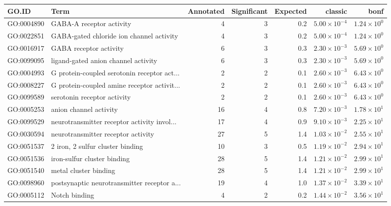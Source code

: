 \begin{table}[ht]
\centering
\begin{adjustbox}{max width=\textwidth}
\begin{tabular}{llrrrrr}
  \hline
GO.ID & Term & Annotated & Significant & Expected & classic & bonf \\ 
  \hline
GO:0004890 & GABA-A receptor activity & 4 & 3 & 0.2 & $5.00 \times 10^{-4}$ & $1.24 \times 10^{0}$ \\ 
  GO:0022851 & GABA-gated chloride ion channel activity & 4 & 3 & 0.2 & $5.00 \times 10^{-4}$ & $1.24 \times 10^{0}$ \\ 
  GO:0016917 & GABA receptor activity & 6 & 3 & 0.3 & $2.30 \times 10^{-3}$ & $5.69 \times 10^{0}$ \\ 
  GO:0099095 & ligand-gated anion channel activity & 6 & 3 & 0.3 & $2.30 \times 10^{-3}$ & $5.69 \times 10^{0}$ \\ 
  GO:0004993 & G protein-coupled serotonin receptor act... & 2 & 2 & 0.1 & $2.60 \times 10^{-3}$ & $6.43 \times 10^{0}$ \\ 
  GO:0008227 & G protein-coupled amine receptor activit... & 2 & 2 & 0.1 & $2.60 \times 10^{-3}$ & $6.43 \times 10^{0}$ \\ 
  GO:0099589 & serotonin receptor activity & 2 & 2 & 0.1 & $2.60 \times 10^{-3}$ & $6.43 \times 10^{0}$ \\ 
  GO:0005253 & anion channel activity & 16 & 4 & 0.8 & $7.20 \times 10^{-3}$ & $1.78 \times 10^{1}$ \\ 
  GO:0099529 & neurotransmitter receptor activity invol... & 17 & 4 & 0.9 & $9.10 \times 10^{-3}$ & $2.25 \times 10^{1}$ \\ 
  GO:0030594 & neurotransmitter receptor activity & 27 & 5 & 1.4 & $1.03 \times 10^{-2}$ & $2.55 \times 10^{1}$ \\ 
  GO:0051537 & 2 iron, 2 sulfur cluster binding & 10 & 3 & 0.5 & $1.19 \times 10^{-2}$ & $2.94 \times 10^{1}$ \\ 
  GO:0051536 & iron-sulfur cluster binding & 28 & 5 & 1.4 & $1.21 \times 10^{-2}$ & $2.99 \times 10^{1}$ \\ 
  GO:0051540 & metal cluster binding & 28 & 5 & 1.4 & $1.21 \times 10^{-2}$ & $2.99 \times 10^{1}$ \\ 
  GO:0098960 & postsynaptic neurotransmitter receptor a... & 19 & 4 & 1.0 & $1.37 \times 10^{-2}$ & $3.39 \times 10^{1}$ \\ 
  GO:0005112 & Notch binding & 4 & 2 & 0.2 & $1.44 \times 10^{-2}$ & $3.56 \times 10^{1}$ \\ 

\end{tabular}
\end{adjustbox}
\end{table}
